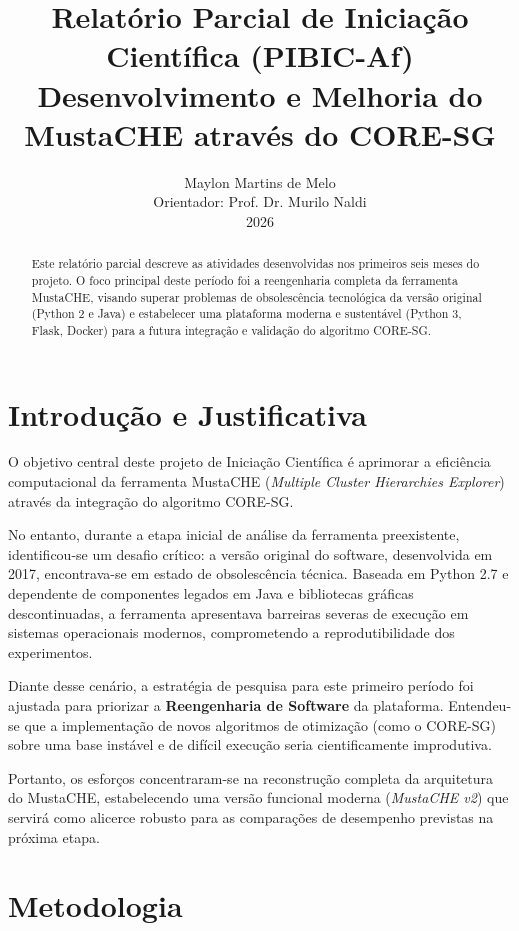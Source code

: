 \documentclass[12pt,a4paper]{article}
\title{Relatório Parcial de Iniciação Científica (PIBIC-Af)\\
\large Desenvolvimento e Melhoria do MustaCHE através do CORE-SG}
\author{Maylon Martins de Melo\\
Orientador: Prof. Dr. Murilo Naldi\\
2026}
\begin{document}
\maketitle

\begin{abstract}
Este relatório parcial descreve as atividades desenvolvidas nos primeiros seis meses do projeto. O foco principal deste período foi a reengenharia completa da ferramenta MustaCHE, visando superar problemas de obsolescência tecnológica da versão original (Python 2 e Java) e estabelecer uma plataforma moderna e sustentável (Python 3, Flask, Docker) para a futura integração e validação do algoritmo CORE-SG.
\end{abstract}

\section{Introdução e Justificativa}

O objetivo central deste projeto de Iniciação Científica é aprimorar a eficiência computacional da ferramenta MustaCHE (\textit{Multiple Cluster Hierarchies Explorer}) através da integração do algoritmo CORE-SG.

No entanto, durante a etapa inicial de análise da ferramenta preexistente, identificou-se um desafio crítico: a versão original do software, desenvolvida em 2017, encontrava-se em estado de obsolescência técnica. Baseada em Python 2.7 e dependente de componentes legados em Java e bibliotecas gráficas descontinuadas, a ferramenta apresentava barreiras severas de execução em sistemas operacionais modernos, comprometendo a reprodutibilidade dos experimentos.

Diante desse cenário, a estratégia de pesquisa para este primeiro período foi ajustada para priorizar a \textbf{Reengenharia de Software} da plataforma. Entendeu-se que a implementação de novos algoritmos de otimização (como o CORE-SG) sobre uma base instável e de difícil execução seria cientificamente improdutiva.

Portanto, os esforços concentraram-se na reconstrução completa da arquitetura do MustaCHE, estabelecendo uma versão funcional moderna (\textit{MustaCHE v2}) que servirá como alicerce robusto para as comparações de desempenho previstas na próxima etapa.

\section{Metodologia}
\end{document}
